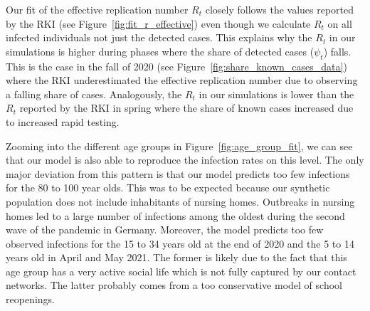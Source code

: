 \begin{figure}[ht]
\end{figure}

Our fit of the effective replication number $R_t$ closely follows the values reported by
the RKI (see Figure~\ref{fig:fit_r_effective}) even though we calculate $R_t$ on all
infected individuals not just the detected cases. This explains why the $R_t$ in our
simulations is higher during phases where the share of detected cases ($\psi_t$) falls.
This is the case in the fall of 2020 (see Figure~\ref{fig:share_known_cases_data}) where
the RKI underestimated the effective replication number due to observing a falling share
of cases. Analogously, the $R_t$ in our simulations is lower than the $R_t$ reported by
the RKI in spring where the share of known cases increased due to increased rapid
testing.

\FloatBarrier

Zooming into the different age groups in Figure~\ref{fig:age_group_fit}, we can see that
our model is also able to reproduce the infection rates on this level. The only major
deviation from this pattern is that our model predicts too few infections for the 80 to
100 year olds. This was to be expected because our synthetic population does not include
inhabitants of nursing homes. Outbreaks in nursing homes led to a large number of
infections among the oldest during the second wave of the pandemic in Germany. Moreover,
the model predicts too few observed infections for the 15 to 34 years old at the end of
2020 and the 5 to 14 years old in April and May 2021. The former is likely due to the
fact that this age group has a very active social life which is not fully captured by our
contact networks. The latter probably comes from a too conservative model of school
reopenings.


